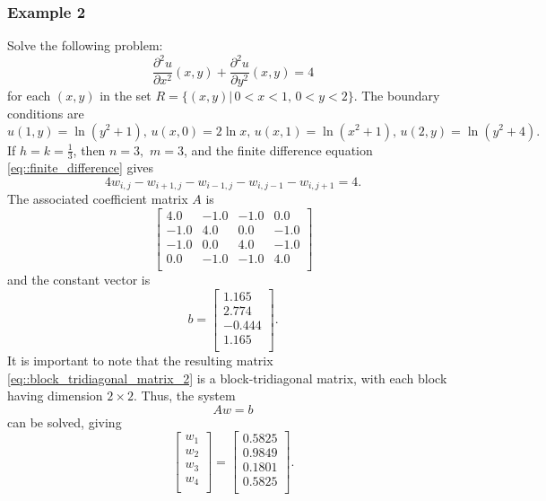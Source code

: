 \documentclass[a4paper]{article}
\begin{document}
\subsubsection{Example 2}
Solve the following problem:
\begin{equation}
\frac{\partial^2 u}{\partial x^2}(x,y)+\frac{\partial^2 u}{\partial y^2}(x,y)=4
\end{equation}
for each $(x,y)$ in the set $R=\{ (x,y)|\, 0<x<1,\, 0<y<2 \}$. The boundary conditions are
\begin{equation*}
u(1,y)=\ln(y^2+1),\,u(x,0)=2\ln x,\, u(x,1)=\ln(x^2+1),\, u(2,y)=\ln(y^2+4).
\end{equation*}
If $h=k=\frac{1}{3}$, then $n=3,\,\,m=3$, and the finite difference equation \ref{eq::finite_difference} gives
\begin{equation}
4w_{i,j}-w_{i+1,j}-w_{i-1,j}-w_{i,j-1}-w_{i,j+1}=4.
\end{equation}
The associated coefficient matrix $A$ is
\begin{equation}\label{eq::block_tridiagonal_matrix_2}
\begin{bmatrix}
 4.0 & -1.0 &  -1.0 &  0.0\\
 -1.0 & 4.0 &  0.0 &  -1.0\\
 -1.0 & 0.0 &  4.0 &  -1.0\\
 0.0 & -1.0 &  -1.0 &  4.0\\    
\end{bmatrix}
\end{equation}
and the constant vector is
\begin{equation*}
b =
\begin{bmatrix}
 1.165 \\
 2.774 \\
 -0.444 \\
 1.165 \\
\end{bmatrix}.
\end{equation*}
It is important to note that the resulting matrix \ref{eq::block_tridiagonal_matrix_2} is a block-tridiagonal matrix, with each block having dimension $2\times 2$. Thus, the system
\begin{equation}
Aw=b
\end{equation}
can be solved, giving
\begin{equation}
\begin{bmatrix}
w_1 \\
w_2 \\
w_3 \\
w_4 \\
\end{bmatrix}=
\begin{bmatrix}
  0.5825 \\
 0.9849 \\
 0.1801 \\
 0.5825 \\
\end{bmatrix}.
\end{equation}
\end{document}
